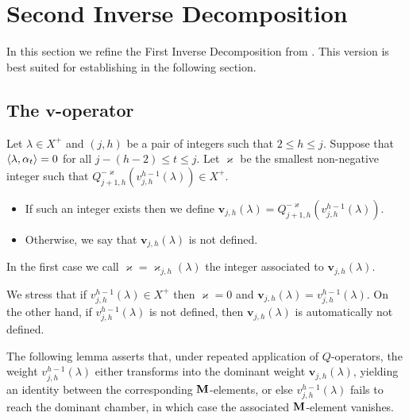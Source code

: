 

\section{Second Inverse Decomposition}
\label{sec: second inverse decomp}

In this section we refine the First Inverse Decomposition from .
This version is best suited for establishing  in the following section.

\subsection{The $\mathbf{v}$-operator}


\begin{definition}\rm \label{def: v negrita}
    Let $\lambda \in X^+$ and  $(j,h)$ be a pair of  integers such that $2\leq h \leq j$.
    Suppose that $\langle \lambda , \alpha_t \rangle=0$ for all $j-(h-2)\leq t \leq j$.
    Let $\varkappa$ be the smallest non-negative integer such that $Q^{-\varkappa}_{j+1,h}(v^{h-1}_{j,h}(\lambda)) \in X^+$.
    \begin{itemize}
        \item If such an integer exists then we define $\mathbf{v}_{j,h}(\lambda) =  Q^{-\varkappa}_{j+1,h}(v^{h-1}_{j,h}(\lambda))$.
        \item Otherwise, we say that $\mathbf{v}_{j,h}(\lambda)$ is not defined. 
    \end{itemize}
     In the first case we call $\varkappa =\varkappa_{j,h}(\lambda) $ the integer associated to $\mathbf{v}_{j,h}(\lambda)$. 
\end{definition}


\begin{remark}\rm \label{rem: varkappa =0}
    We stress that if $v^{h-1}_{j,h}(\lambda)\in X^+$  then $\varkappa=0$ and $\mathbf{v}_{j,h}(\lambda) = v^{h-1}_{j,h}(\lambda)$.
    On the other hand, if $v^{h-1}_{j,h}(\lambda)$ is not defined, then $\mathbf{v}_{j,h}(\lambda)$ is automatically not defined.
\end{remark}

The following lemma asserts that, under repeated application of  $Q$-operators, the weight $v^{h-1}_{j,h}(\lambda)$ either transforms into the dominant weight $\mathbf{v}_{j,h}(\lambda)$, yielding an identity between the corresponding $\mathbf{M}$-elements, or else $v^{h-1}_{j,h}(\lambda)$ fails to reach the dominant chamber, in which case the associated $\mathbf{M}$-element vanishes.

